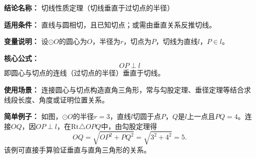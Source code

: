 \textbf{结论名称：} 切线性质定理（切线垂直于过切点的半径）

\textbf{适用条件：} 直线与圆相切，且已知切点；或需由垂直关系反推切线。

\textbf{变量说明：} 设$\odot O$的圆心为$O$，半径为$r$，切点为$P$，切线为直线$l$，$P\in l$。

\textbf{核心公式：}
\[
\boxed{OP \perp l}
\]
即圆心与切点的连线（过切点的半径）垂直于切线。

\textbf{使用场景：} 连接圆心与切点构造直角三角形，常与勾股定理、垂径定理等结合求线段长度、角度或证明位置关系。

\textbf{简单例子：} 如图，$\odot O$的半径$r=3$，直线$l$切圆于点$P$，$Q$是$l$上一点且$PQ=4$。连接$OQ$，因$OP\perp l$，在$\mathrm{Rt}\triangle OPQ$中，由勾股定理得
\[
OQ = \sqrt{OP^{2}+PQ^{2}} = \sqrt{3^{2}+4^{2}} = 5.
\]
该例可直接手算验证垂直与直角三角形的关系。